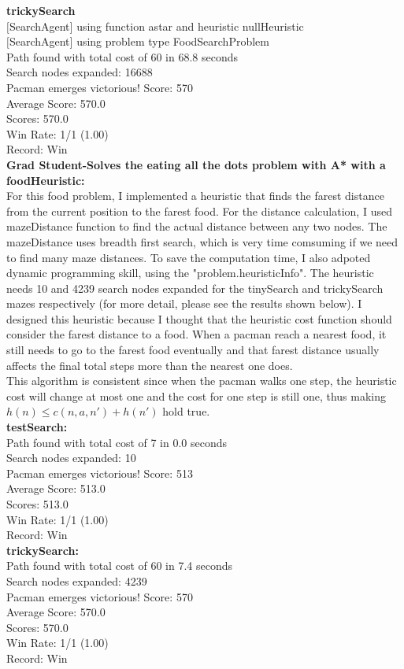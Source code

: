 \documentclass[11pt]{article}
\begin{document}
\noindent
\textbf{trickySearch}\\
$[$SearchAgent$]$ using function astar and heuristic nullHeuristic\\
$[$SearchAgent$]$ using problem type FoodSearchProblem\\
Path found with total cost of 60 in 68.8 seconds\\
Search nodes expanded: 16688\\
Pacman emerges victorious! Score: 570\\
Average Score: 570.0\\
Scores:        570.0\\
Win Rate:      1/1 (1.00)\\
Record:        Win\\

\newpage
\noindent
\textbf{Grad Student-Solves the eating all the dots problem with A* with a foodHeuristic:}\\
For this food problem, I implemented a heuristic that finds the farest distance from the current position to the farest food. For the distance calculation, I used mazeDistance function to find the actual distance between any two nodes. The mazeDistance uses breadth first search, which is very time comsuming if we need to find many maze distances. To save the computation time, I also adpoted dynamic programming skill, using the "problem.heuristicInfo". The heuristic needs 10 and 4239 search nodes expanded for the tinySearch and trickySearch mazes respectively (for more detail, please see the results shown below). I designed this heuristic because I thought that the heuristic cost function should consider the farest distance to a food. When a pacman reach a nearest food, it still needs to go to the farest food eventually and that farest distance usually affects the final total steps more than the nearest one does.\\

\noindent
This algorithm is consistent since when the pacman walks one step, the heuristic cost will change at most one and the cost for one step is still one, thus making $h(n) \leq c(n, a, n') + h(n')$ hold true.\\

\noindent
\textbf{testSearch:}\\
Path found with total cost of 7 in 0.0 seconds\\
Search nodes expanded: 10\\
Pacman emerges victorious! Score: 513\\
Average Score: 513.0\\
Scores:        513.0\\
Win Rate:      1/1 (1.00)\\
Record:        Win\\

\noindent
\textbf{trickySearch:}\\
Path found with total cost of 60 in 7.4 seconds\\
Search nodes expanded: 4239\\
Pacman emerges victorious! Score: 570\\
Average Score: 570.0\\
Scores:        570.0\\
Win Rate:      1/1 (1.00)\\
Record:        Win\\
\end{document}
